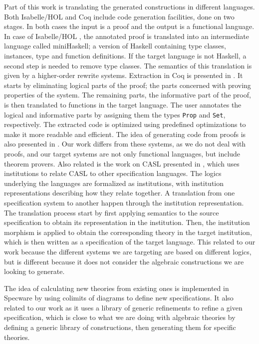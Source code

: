 Part of this work is translating the generated constructions in different languages. Both Isabelle/HOL 
and Coq include code generation facilities, done on two stages. In both cases the input is a proof and 
the output is a functional language. 
In case of Isabelle/HOL \cite{haftmann2010code}, the annotated 
proof is translated into an intermediate language called miniHaskell; a version of Haskell containing 
type classes, instances, type and function definitions. If the target language is not Haskell, a second 
step is needed to remove type classes. The semantics of this translation is given by a higher-order 
rewrite systems. 
Extraction in Coq is presented in \cite{letouzey2002new}.  It starts by eliminating 
logical parts of the proof; the parts concerned with proving properties of the system. The remaining 
parts, the informative part of the proof, is then translated to functions in the target language. The user 
annotates the logical and informative parts by assigning them the types \verb|Prop| and \verb|Set|, 
respectively. The extracted code is optimized using predefined optimizations to make it more readable 
and efficient. The idea of generating code from proofs is also presented in 
\cite{poernomo2005adapting}. 
Our work differs from these systems, as we do not deal with proofs, and our target systems are 
not only functional languages, but include theorem provers. 
Also related is the work on CASL presented in \cite{mossakowski2002relating}, which uses institutions 
to relate CASL to other specification languages. The logics underlying the languages are formalized as 
institutions, with institution representations describing how they relate together. A translation from 
one specification system to another happen through the institution representation. The translation 
process start by first applying semantics to the source specification to obtain its representation in the 
institution. Then, the institution morphism is applied to obtain the corresponding theory in the target 
institution, which is then written as a specification of the target language. This related to our work 
because the different systems we are targeting are based on different logics, but is different because it 
does not consider the algebraic constructions we are looking to generate. 

The idea of calculating new theories from existing ones is implemented in Specware 
\cite{smith1999mechanizing} by using colimits of diagrams to define new specifications. It also related 
to our work as it uses a library of generic refinements to refine a given specification, which is 
close to what we are doing with algebraic theories by defining a generic library of constructions, then 
generating them for specific theories. 

